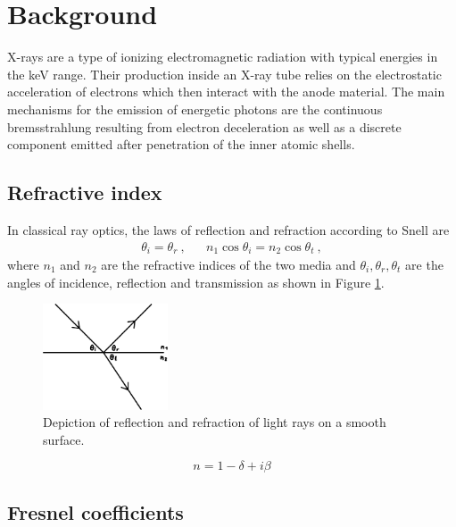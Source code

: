\section{Background}

X-rays are a type of ionizing electromagnetic radiation with typical energies in the \unit{\kilo\electronvolt} range. Their
production inside an X-ray tube relies on the electrostatic acceleration of electrons which then interact with the anode material. The main
mechanisms for the emission of energetic photons are the continuous bremsstrahlung resulting from electron deceleration as well as a
discrete component emitted after penetration of the inner atomic shells.



\subsection{Refractive index}

In classical ray optics, the laws of reflection and refraction according to Snell are
\begin{align*}
	\theta_i = \theta_r \: , && n_1 \cos\theta_i = n_2 \cos\theta_t \: ,
\end{align*}
where $n_1$ and $n_2$ are the refractive indices of the two media and $\theta_i, \theta_r, \theta_t$ are the angles of incidence, reflection
and transmission as shown in Figure \ref{fig:fresnel}.

\begin{figure}
	\centering
	\includegraphics[width=0.33\textwidth]{content/graphics/fresnel.pdf}
	\caption{Depiction of reflection and refraction of light rays on a smooth surface.}
	\label{fig:fresnel}
\end{figure}

\begin{equation*}
	n = 1 - \delta + i\beta
\end{equation*}



\subsection{Fresnel coefficients}

